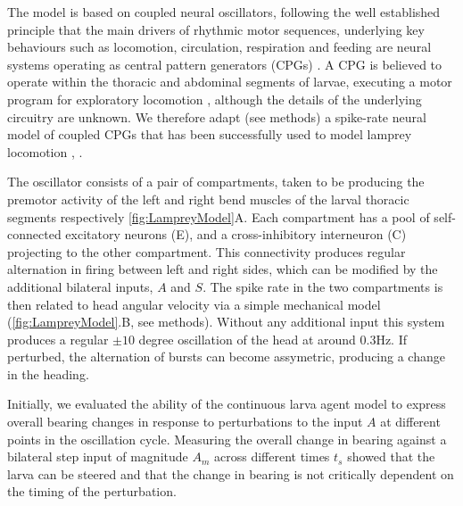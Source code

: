 \documentclass[10pt,a4paper]{article}
\begin{document}
The model is based on coupled neural oscillators, following the well established principle that the main drivers of rhythmic  motor sequences, underlying key behaviours such as locomotion, circulation, respiration and feeding are neural systems operating as central pattern generators (CPGs) \citep{delcomyn1980neural}. A CPG is believed to operate  within the thoracic and abdominal segments of larvae, executing a motor program for exploratory locomotion \citep{berni2012autonomous,lemon2015whole}, although the details of the underlying circuitry are unknown. We therefore adapt (see methods) a spike-rate neural model of coupled CPGs that has been successfully used to model lamprey locomotion \citep{cohen1992modelling,lansner1997realistic}, \cite[see][]{marder1996principles}.


The oscillator consists of a pair of compartments, taken to be producing the premotor activity of the left and right bend muscles of the larval thoracic  segments respectively \ref{fig:LampreyModel}A. Each compartment has a pool of self-connected excitatory neurons (E), and a cross-inhibitory interneuron (C) projecting to the other compartment. This connectivity produces regular alternation in firing between left and right sides, which can be modified by the additional bilateral inputs, $A$ and $S$. The spike rate in the two compartments is then related to head angular velocity via a simple mechanical model (\ref{fig:LampreyModel}.B, see methods). Without any additional input this system produces a regular $\pm 10$ degree oscillation of the head at around 0.3Hz. If perturbed, the alternation of bursts can become assymetric, producing a change in the heading. 

Initially, we evaluated the ability of the continuous larva agent model to express overall bearing changes in response to perturbations to the input $A$ at different points in the oscillation cycle. Measuring the overall change in bearing against a bilateral step input of magnitude $A_m$ across different times $t_s$ showed that the larva can be steered and that the change in bearing is not critically dependent on the timing of the perturbation. 

\end{document}
